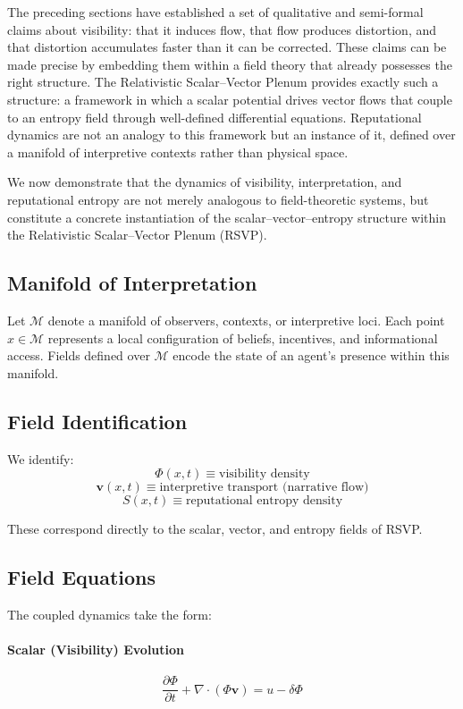 \documentclass[12pt,a4paper]{article}
\begin{document}
The preceding sections have established a set of qualitative and semi-formal claims about visibility: that it induces flow, that flow produces distortion, and that distortion accumulates faster than it can be corrected. These claims can be made precise by embedding them within a field theory that already possesses the right structure. The Relativistic Scalar--Vector Plenum provides exactly such a structure: a framework in which a scalar potential drives vector flows that couple to an entropy field through well-defined differential equations. Reputational dynamics are not an analogy to this framework but an instance of it, defined over a manifold of interpretive contexts rather than physical space.

We now demonstrate that the dynamics of visibility, interpretation, and reputational entropy are not merely analogous to field-theoretic systems, but constitute a concrete instantiation of the scalar--vector--entropy structure within the Relativistic Scalar--Vector Plenum (RSVP).

\subsection{Manifold of Interpretation}

Let $\mathcal{M}$ denote a manifold of observers, contexts, or interpretive loci. Each point $x \in \mathcal{M}$ represents a local configuration of beliefs, incentives, and informational access. Fields defined over $\mathcal{M}$ encode the state of an agent's presence within this manifold.

\subsection{Field Identification}

We identify:
\[
\Phi(x,t) \equiv \text{visibility density}
\]
\[
\mathbf{v}(x,t) \equiv \text{interpretive transport (narrative flow)}
\]
\[
S(x,t) \equiv \text{reputational entropy density}
\]

These correspond directly to the scalar, vector, and entropy fields of RSVP.

\subsection{Field Equations}

The coupled dynamics take the form:

\paragraph{Scalar (Visibility) Evolution}
\[
\frac{\partial \Phi}{\partial t}
+ \nabla \cdot (\Phi \mathbf{v})
=
u - \delta \Phi
\]
\end{document}
